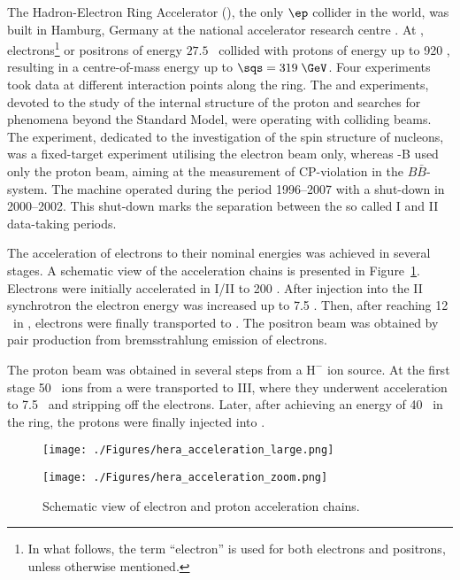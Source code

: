 The Hadron-Electron Ring Accelerator (\hera), the only $\ep$ collider in the world, was built in Hamburg, Germany at the national accelerator research centre \desy. At \hera, electrons\footnote{In what follows, the term ``electron'' is used for both electrons and positrons, unless otherwise mentioned.} or positrons of energy $27.5$ \GeV\, collided with protons of energy up to 920 \GeV, resulting in a centre-of-mass energy up to $\sqs = 319\; \GeV$. Four experiments took data at different interaction points along the \hera ring. The \zeus and \hone experiments, devoted to the study of the internal structure of the proton and searches for phenomena beyond the Standard Model, were operating with colliding beams. The \hermes experiment, dedicated to the investigation of the spin structure of nucleons, was a fixed-target experiment utilising the electron beam only, whereas \hera-B used only the proton beam, aiming at the measurement of CP-violation in the $B\bar{B}$-system. The \hera machine operated during the period 1996--2007 with a shut-down in 2000--2002. This shut-down marks the separation between the so called \hera I and \hera II data-taking periods.

The acceleration of electrons to their nominal energies was achieved in several stages. A schematic view of the acceleration chains is presented in Figure~\ref{fig:hera_acceleration}. Electrons were initially accelerated in \linac I/II to 200 \MeV. After injection into the \desy II synchrotron the electron energy was increased up to 7.5 \GeV. Then, after reaching 12 \GeV\, in \petra, electrons were finally transported to \hera. The positron beam was obtained by pair production from bremsstrahlung emission of electrons. 

The proton beam was obtained in several steps from a $\text{H}^-$ ion source. At the first stage 50 \MeV\, ions from a \linac were transported to \desy III, where they underwent acceleration to 7.5 \GeV\, and stripping off the electrons. Later, after achieving an energy of 40 \GeV\, in the \petra ring, the protons were finally injected into \hera.

\begin{figure}[htpb]
	\centering
	\begin{subfloat}[]{\texttt{[image: ./Figures/hera\_acceleration\_large.png]}
			\label{fig:hera_acceleration_large}
	 }%
	\end{subfloat}
	\begin{subfloat}[]{\texttt{[image: ./Figures/hera\_acceleration\_zoom.png]}
			\label{fig:hera_acceleration_zoom}
	 }%
	\end{subfloat}
	\caption{Schematic view of electron and proton acceleration chains.}
\label{fig:hera_acceleration}
\end{figure}

